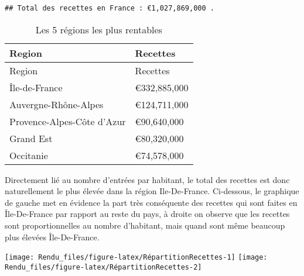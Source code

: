 \documentclass[
]{article}
\begin{document}
\begin{verbatim}
## Total des recettes en France : €1,027,869,000 .
\end{verbatim}

\begin{longtable}[]{@{}ll@{}}
\caption{Les 5 régions les plus rentables}\tabularnewline
\toprule
Region & Recettes \\
\midrule
\endfirsthead
\toprule
Region & Recettes \\
\midrule
\endhead
Île-de-France & €332,885,000 \\
Auvergne-Rhône-Alpes & €124,711,000 \\
Provence-Alpes-Côte d'Azur & €90,640,000 \\
Grand Est & €80,320,000 \\
Occitanie & €74,578,000 \\
\bottomrule
\end{longtable}

Directement lié au nombre d'entrées par habitant, le total des recettes
est donc naturellement le plus élevée dans la région Ile-De-France.
Ci-dessous, le graphique de gauche met en évidence la part très
conséquente des recettes qui sont faites en Île-De-France par rapport au
reste du pays, à droite on observe que les recettes sont
proportionnelles au nombre d'habitant, mais quand sont même beaucoup
plus élevées Île-De-France.

\texttt{[image: Rendu\_files/figure-latex/RépartitionRecettes-1]}
\texttt{[image: Rendu\_files/figure-latex/RépartitionRecettes-2]}
\end{document}
